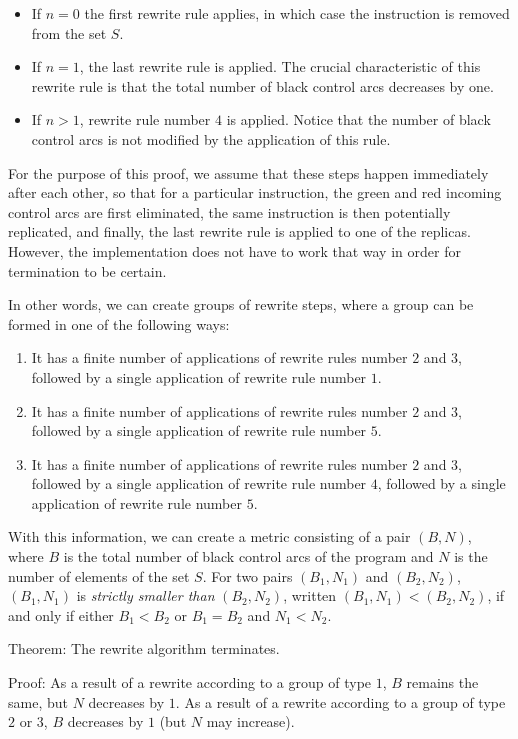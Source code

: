 \begin{itemize}
\item If $n=0$ the first rewrite
rule applies, in which case the instruction is removed from the set
$S$.
\item If $n=1$, the last rewrite rule is applied.  The crucial
  characteristic of this rewrite rule is that the total number of
  black control arcs decreases by one.
\item If $n>1$, rewrite rule number $4$ is applied.  Notice that the
  number of black control arcs is not modified by the application of
  this rule.
\end{itemize}

For the purpose of this proof, we assume that these steps happen
immediately after each other, so that for a particular instruction,
the green and red incoming control arcs are first eliminated, the same
instruction is then potentially replicated, and finally, the last
rewrite rule is applied to one of the replicas.  However, the
implementation does not have to work that way in order for termination
to be certain.

In other words, we can create groups of rewrite steps, where a group
can be formed in one of the following ways:

\begin{enumerate}
\item It has a finite number of applications of rewrite rules number
  $2$ and $3$, followed by a single application of rewrite rule number
  $1$.
\item It has a finite number of applications of rewrite rules number
  $2$ and $3$, followed by a single application of rewrite rule number
  $5$.
\item It has a finite number of applications of rewrite rules number
  $2$ and $3$, followed by a single application of rewrite rule number
  $4$, followed by a single application of rewrite rule number $5$.
\end{enumerate}

With this information, we can create a metric consisting of a pair
$(B,N)$, where $B$ is the total number of black control arcs of the
program and $N$ is the number of elements of the set $S$.  For two
pairs $(B_1,N_1)$ and $(B_2,N_2)$, $(B_1,N_1)$ is \emph{strictly
  smaller than} $(B_2,N_2)$, written $(B_1,N_1) < (B_2,N_2)$, if and
only if either $B_1 < B_2$ or $B_1 = B_2$ and $N_1 < N_2$.

Theorem: The rewrite algorithm terminates.

Proof: As a result of a rewrite according to a group of type $1$, $B$
remains the same, but $N$ decreases by $1$.  As a result of a rewrite
according to a group of type $2$ or $3$, $B$ decreases by $1$ (but $N$
may increase).
